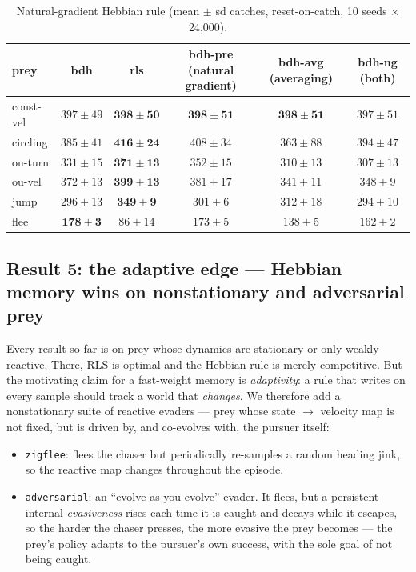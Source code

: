 \documentclass[11pt]{article}
\begin{document}
\begin{table}[t]
\centering
\caption{Natural-gradient Hebbian rule (mean $\pm$ sd catches, reset-on-catch, 10 seeds $\times$
24{,}000).}
\label{tab:naturalgradient}
\small
\begin{tabular}{lccccc}
\toprule
prey & bdh & rls & bdh-pre (natural gradient) & bdh-avg (averaging) & bdh-ng (both) \\
\midrule
const-vel & \emph{$397 \pm 49$} & $\mathbf{398 \pm 50}$ & $\mathbf{398 \pm 51}$ & $\mathbf{398 \pm 51}$ & \emph{$397 \pm 51$} \\
circling  & $385 \pm 41$ & $\mathbf{416 \pm 24}$ & \emph{$408 \pm 34$} & $363 \pm 88$ & $394 \pm 47$ \\
ou-turn   & $331 \pm 15$ & $\mathbf{371 \pm 13}$ & \emph{$352 \pm 15$} & $310 \pm 13$ & $307 \pm 13$ \\
ou-vel    & $372 \pm 13$ & $\mathbf{399 \pm 13}$ & \emph{$381 \pm 17$} & $341 \pm 11$ & $348 \pm 9$ \\
jump      & $296 \pm 13$ & $\mathbf{349 \pm 9}$  & $301 \pm 6$  & \emph{$312 \pm 18$} & $294 \pm 10$ \\
flee      & $\mathbf{178 \pm 3}$ & $86 \pm 14$ & \emph{$173 \pm 5$} & $138 \pm 5$ & $162 \pm 2$ \\
\bottomrule
\end{tabular}
\end{table}

\subsection{Result 5: the adaptive edge --- Hebbian memory wins on nonstationary and adversarial
prey}\label{sec:nonstationary}

Every result so far is on prey whose dynamics are stationary or only weakly reactive. There, RLS
is optimal and the Hebbian rule is merely competitive. But the motivating claim for a fast-weight
memory is \emph{adaptivity}: a rule that writes on every sample should track a world that
\emph{changes}. We therefore add a nonstationary suite of reactive evaders --- prey whose
state $\to$ velocity map is not fixed, but is driven by, and co-evolves with, the pursuer
itself:

\begin{itemize}
\item \texttt{zigflee}: flees the chaser but periodically re-samples a random heading jink, so
  the reactive map changes throughout the episode.
\item \texttt{adversarial}: an ``evolve-as-you-evolve'' evader. It flees, but a persistent
  internal \emph{evasiveness} rises each time it is caught and decays while it escapes, so the
  harder the chaser presses, the more evasive the prey becomes --- the prey's policy adapts to
  the pursuer's own success, with the sole goal of not being caught.
\end{itemize}
\end{document}
